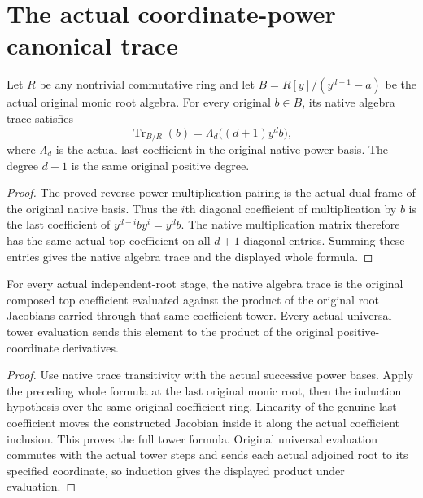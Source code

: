 \section{The actual coordinate-power canonical trace}

\begin{lemma}
\label{lem:kn-nadel-root-trace-jacobian}
\leanok
Let $R$ be any nontrivial commutative ring and let
$B=R[y]/(y^{d+1}-a)$ be the actual original monic root algebra.  For every
original $b\in B$, its native algebra trace satisfies
\[
  \operatorname{Tr}_{B/R}(b)
    =\Lambda_d\big((d+1)y^d b\big),
\]
where $\Lambda_d$ is the actual last coefficient in the original native
power basis.  The degree $d+1$ is the same original positive degree.
\end{lemma}
\begin{proof}
The proved reverse-power multiplication pairing is the actual dual frame
of the original native basis.  Thus the $i$th diagonal coefficient of
multiplication by $b$ is the last coefficient of
$y^{d-i}b y^i=y^d b$.  The native multiplication matrix therefore has the
same actual top coefficient on all $d+1$ diagonal entries.  Summing these
entries gives the native algebra trace and the displayed whole formula.
\end{proof}

\begin{lemma}
\label{lem:kn-nadel-tower-trace-jacobian}
\leanok
{}
For every actual independent-root stage, the native algebra trace is the
original composed top coefficient evaluated against the product of the
original root Jacobians carried through that same coefficient tower.
Every actual universal tower evaluation sends this element to the product
of the original positive-coordinate derivatives.
\end{lemma}
\begin{proof}
Use native trace transitivity with the actual successive power bases.
Apply the preceding whole formula at the last original monic root, then
the induction hypothesis over the same original coefficient ring.
Linearity of the genuine last coefficient moves the constructed
Jacobian inside it along the actual coefficient inclusion.  This proves
the full tower formula.  Original universal evaluation commutes with the
actual tower steps and sends each actual adjoined root to its specified
coordinate, so induction gives the displayed product under evaluation.
\end{proof}

